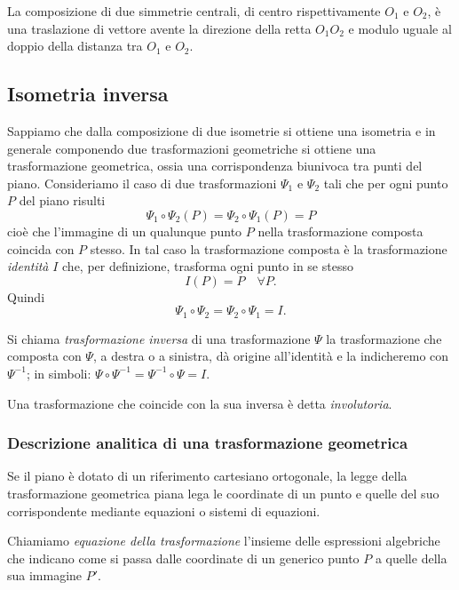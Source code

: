 \begin{proposizione}
La composizione di due simmetrie centrali, di centro rispettivamente 
$O_1$ e $O_2$, è una traslazione di vettore avente la direzione della 
retta $O_1O_2$ e modulo uguale al doppio della distanza tra $O_1$ e 
$O_2$.
\end{proposizione}
    
\subsection{Isometria inversa}
      
Sappiamo che dalla composizione di due isometrie si ottiene una 
isometria e in generale componendo due trasformazioni geometriche si 
ottiene una trasformazione geometrica, ossia una corrispondenza 
biunivoca tra punti del piano.
Consideriamo il caso di due trasformazioni $\Psi_1$ e $\Psi_2$ tali 
che per ogni punto $P$ del piano risulti
\[\Psi_1 \circ \Psi_2 (P) = \Psi_2 \circ \Psi_1 (P) = P\]
cioè che l'immagine di un qualunque punto $P$ nella trasformazione 
composta coincida con $P$ stesso. In tal caso la trasformazione 
composta è la trasformazione \emph{identità} $I$ che, per 
definizione, trasforma ogni punto in se stesso
\[I(P) = P\quad \forall P.\]
Quindi
\[\Psi_1 \circ \Psi_2 = \Psi_2 \circ \Psi_1 = I.\]

\begin{definizione}
Si chiama \emph{trasformazione inversa} di una trasformazione $\Psi$ 
la trasformazione che composta con $\Psi$, a destra o a sinistra, dà 
origine all'identità e la indicheremo con $\Psi^{-1}$; in simboli: 
$\Psi \circ \Psi^{-1} = \Psi^{-1} \circ \Psi = I$.
\end{definizione}
      
\begin{definizione}
Una trasformazione che coincide con la sua inversa è detta 
\emph{involutoria}.
\end{definizione}

\subsubsection{\textbf{Descrizione analitica di una trasformazione geometrica}}
Se il piano è dotato di un riferimento cartesiano ortogonale, la 
legge della trasformazione geometrica piana lega le coordinate di un 
punto e quelle del suo corrispondente mediante equazioni o sistemi di 
equazioni.

\begin{definizione}
  Chiamiamo \emph{equazione della trasformazione} l'insieme delle 
  espressioni algebriche che indicano come si passa dalle coordinate di 
  un generico punto $P$ a quelle della sua immagine $P'$.
\end{definizione}

